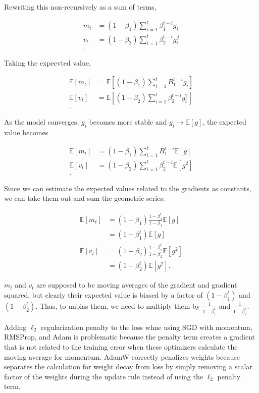 \documentclass[answers]{exam}
\begin{document}
\begin{questions}
\begin{parts}
\begin{solution}
Rewriting this non-recursively as a sum of terms,

\begin{align*}
m_{t} &= (1-\beta_1) \sum_{i=1}^{t}\beta_1^{t-i} g_{i}  \\
v_{t} &= (1-\beta_2) \sum_{i=1}^{t}\beta_2^{t-i} g_{i}^2 \\
.\end{align*}

Taking the expecvted value,

\begin{align*}
\mathbb{E}[m_{t}] &= \mathbb{E}\left[(1-\beta_1) \sum_{i=1}^{t}B_1^{t-i} g_{i}\right] \\
\mathbb{E}[v_{t}] &= \mathbb{E}\left[(1-\beta_2) \sum_{i=1}^{t}\beta_2^{t-i} g_{i}^2\right] \\
.\end{align*}

As the model converges, $g_i$ becomes more stable and $g_i \to \mathbb{E}[g]$, 
the expected value becomes

\begin{align*}
\mathbb{E}[m_{t}] &= (1-\beta_1) \sum_{i=1}^{t}B_1^{t-i} \mathbb{E}[g] \\
\mathbb{E}[v_{t}] &= (1-\beta_2) \sum_{i=1}^{t}\beta_2^{t-i} \mathbb{E}[g^2]\\
.\end{align*}

Since we can estimate the expected values related to the gradients as constants,
we can take them out and sum the geometric series:

\begin{align*}
\mathbb{E}[m_{t}] &= (1-\beta_1) \frac{1-\beta_1^{t}}{1-\beta_1} \mathbb{E}[g] \\
&= (1-\beta_1^{t})\mathbb{E}[g] \\
\mathbb{E}[v_{t}] &= (1-\beta_2) \frac{1-\beta_2^{t}}{1-\beta_2} \mathbb{E}[g^2] \\
&= (1-\beta_2^{t})\mathbb{E}[g^2]
.\end{align*}

$m_{t}$ and $v_{t}$ are supposed to be moving averages of the gradient and
gradient squared, but clearly their expected value is biased by a factor of
$(1-\beta_1^{t})$ and $(1-\beta_2^{t})$. Thus, to unbias them, we need to
multiply them by $\frac{1}{1-\beta_1^{t}}$ and $\frac{1}{1-\beta_2^{t}}$.

Adding $\ell_2$ regularization penalty to the loss whne using SGD with momentum,
RMSProp, and Adam is problematic because the penalty term creates a gradient
that is not related to the training error when these optimizers calculate the
moving average for momentum. AdamW correctly penalizes weights because separates
the calculation for weight decay from loss by simply removing a scalar factor of
the weights during the update rule instead of using the $\ell_2$ penalty term.


\end{solution}
\end{parts}
\end{questions}
\end{document}
